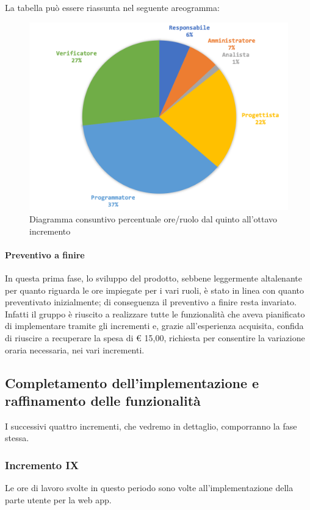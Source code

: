		La tabella può essere riassunta nel seguente areogramma:
		\begin{figure}[H]
			\centering
			\includegraphics[width=0.8\linewidth]{./images/consuntivo/ConsIncr5-8-2.png}
			\caption{Diagramma consuntivo percentuale ore/ruolo dal quinto all'ottavo incremento}
			\label{fig:diagramma consuntivo costi ruolo incrementi V-VIII}
		\end{figure}
		\pagebreak
		\paragraph{Preventivo a finire}
		In questa prima fase, lo sviluppo del prodotto, sebbene leggermente altalenante per quanto riguarda le ore impiegate per i vari ruoli, è stato in linea con quanto preventivato inizialmente; di conseguenza il preventivo a finire resta invariato.
		\newline
		Infatti il gruppo è riuscito a realizzare tutte le funzionalità che aveva pianificato di implementare tramite gli incrementi e, grazie all'esperienza acquisita, confida di riuscire a recuperare la spesa di € 15,00, richiesta per consentire la variazione oraria necessaria, nei vari incrementi.
		
		\subsection{Completamento dell'implementazione e raffinamento delle funzionalità}
		I successivi quattro incrementi, che vedremo in dettaglio, comporranno la fase stessa.  		
		
		\subsubsection{Incremento IX}
			Le ore di lavoro svolte in questo periodo sono volte all'implementazione della parte utente per la web app.
